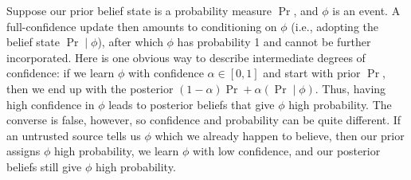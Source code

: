 \begin{example}
 \label{ex:prob-simple}
Suppose our prior belief state is a probability measure $\Pr$, and $\phi$ is an event.
A full-confidence update then amounts to conditioning on $\phi$ (i.e., adopting the belief state $\Pr\mid\phi$), after which $\phi$ has probability 1 and cannot be further incorporated.
Here is one obvious way
to describe intermediate degrees of confidence:
if we learn $\phi$ with confidence
$\alpha \in [0,1]$
and start with prior $\Pr$, then we end up with the
posterior $(1-\alpha)\Pr + \alpha (\Pr\mid \phi)$.
%
Thus, having high confidence in $\phi$ leads to posterior beliefs that give $\phi$
high probability.
The converse is false, however, so
confidence and probability can be quite different.
If an untrusted source tells us $\phi$ which we already happen to believe,
then our prior assigns $\phi$ high probability,
we learn $\phi$ with low confidence,
and our posterior beliefs still give $\phi$ high probability.
\end{example}


